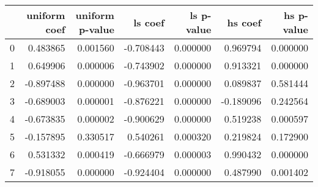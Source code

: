 \begin{tabular}{lrrrrrr}
\toprule
 & uniform coef & uniform p-value & ls coef & ls p-value & hs coef & hs p-value \\
\midrule
0 & 0.483865 & 0.001560 & -0.708443 & 0.000000 & 0.969794 & 0.000000 \\
1 & 0.649906 & 0.000006 & -0.743902 & 0.000000 & 0.913321 & 0.000000 \\
2 & -0.897488 & 0.000000 & -0.963701 & 0.000000 & 0.089837 & 0.581444 \\
3 & -0.689003 & 0.000001 & -0.876221 & 0.000000 & -0.189096 & 0.242564 \\
4 & -0.673835 & 0.000002 & -0.900629 & 0.000000 & 0.519238 & 0.000597 \\
5 & -0.157895 & 0.330517 & 0.540261 & 0.000320 & 0.219824 & 0.172900 \\
6 & 0.531332 & 0.000419 & -0.666979 & 0.000003 & 0.990432 & 0.000000 \\
7 & -0.918055 & 0.000000 & -0.924404 & 0.000000 & 0.487990 & 0.001402 \\
\bottomrule
\end{tabular}
